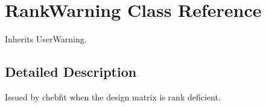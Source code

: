 \hypertarget{classpyneb_1_1utils_1_1polyutils_1_1_rank_warning}{}\section{Rank\+Warning Class Reference}
\label{classpyneb_1_1utils_1_1polyutils_1_1_rank_warning}


Inherits User\+Warning.



\subsection{Detailed Description}
\begin{DoxyVerb}Issued by chebfit when the design matrix is rank deficient.\end{DoxyVerb}
 